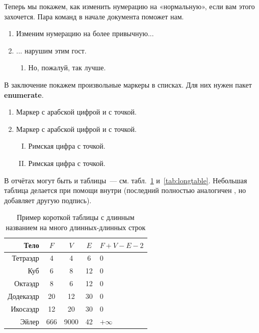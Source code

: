 Теперь мы покажем, как изменить нумерацию на «нормальную», если вам этого захочется. Пара команд в начале документа поможет нам.

\renewcommand{\labelenumi}{\arabic{enumi})}
\renewcommand{\labelenumii}{\asbuk{enumii})}

\begin{enumerate}
\item Изменим нумерацию на более привычную...
\item ... нарушим этим гост.
\begin{enumerate}
\item Но, пожалуй, так лучше.
\end{enumerate}
\end{enumerate}

В заключение покажем произвольные маркеры в списках. Для них нужен пакет \textbf{enumerate}.
\begin{enumerate}[1.]
\item Маркер с арабской цифрой и с точкой.
\item Маркер с арабской цифрой и с точкой.
\begin{enumerate}[I.]
\item Римская цифра с точкой.
\item Римская цифра с точкой.
\end{enumerate}
\end{enumerate}

В отчётах могут быть и таблицы~--- см. табл.~\ref{tab:tabular} и~\ref{tab:longtable}.
Небольшая таблица делается при помощи  внутри  (последний
полностью аналогичен , но добавляет другую подпись).

\begin{table}[ht]
  \caption{Пример короткой таблицы с длинным названием на много длинных-длинных строк}
  \begin{tabular}{|r|c|c|c|l|}
  \hline
  Тело      & $F$ & $V$  & $E$ & $F+V-E-2$ \\
  \hline
  Тетраэдр  & 4   & 4    & 6   & 0         \\
  Куб       & 6   & 8    & 12  & 0         \\
  Октаэдр   & 8   & 6    & 12  & 0         \\
  Додекаэдр & 20  & 12   & 30  & 0         \\
  Икосаэдр  & 12  & 20   & 30  & 0         \\
  \hline
  Эйлер     & 666 & 9000 & 42  & $+\infty$ \\
  \hline
  \end{tabular}
  \label{tab:tabular}
\end{table}

